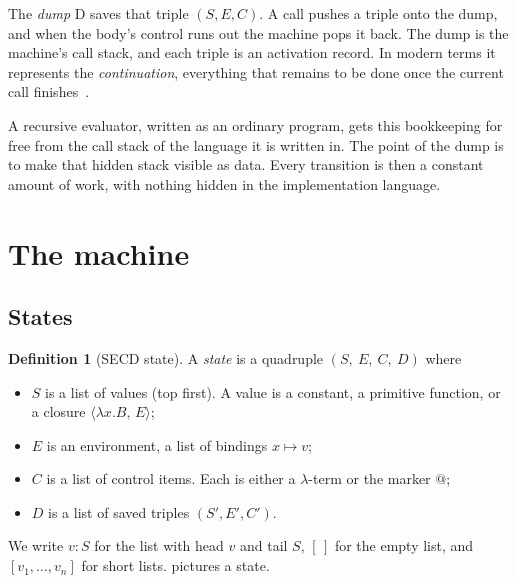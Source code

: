 \documentclass[11pt,a4paper]{article}
\makeatletter
\newcommand{\ap}{\mathtt{@}}
\newcommand{\cl}[2]{\langle #1,\, #2\rangle}
\newcommand{\emp}{[\,]}
\newcommand{\st}[4]{(#1,\ #2,\ #3,\ #4)}
\theoremstyle{definition}
\newtheorem{definition}{Definition}
\theoremstyle{plain}
\makeatother
\begin{document}
The \emph{dump} D saves that triple $(S, E, C)$. A call pushes a triple onto
the dump, and when the body's control runs out the machine pops it back. The
dump is the machine's call stack, and each triple is an activation record.
In modern terms it represents the \emph{continuation}, everything that
remains to be done once the current call finishes~\cite{danvy-secd}.

A recursive evaluator, written as an ordinary program, gets this bookkeeping for
free from the call stack of the language it is written in. The point of
the dump is to make that hidden stack visible as data. Every transition is then
a constant amount of work, with nothing hidden in the implementation language.

\section{The machine}\label{sec:machine}

\subsection{States}

\begin{definition}[SECD state]
A \emph{state} is a quadruple $\st{S}{E}{C}{D}$ where
\begin{itemize}[nosep]
\item $S$ is a list of values (top first). A value is a constant, a
  primitive function, or a closure $\cl{\lambda x.B}{E}$;
\item $E$ is an environment, a list of bindings $x\mapsto v$;
\item $C$ is a list of control items. Each is either a $\lambda$-term or the
  marker $\ap$;
\item $D$ is a list of saved triples $(S', E', C')$.
\end{itemize}
\end{definition}

We write $v : S$ for the list with head $v$ and tail $S$, $\emp$ for the
empty list, and $[v_1, \dots, v_n]$ for short lists.
 pictures a state.
\end{document}

